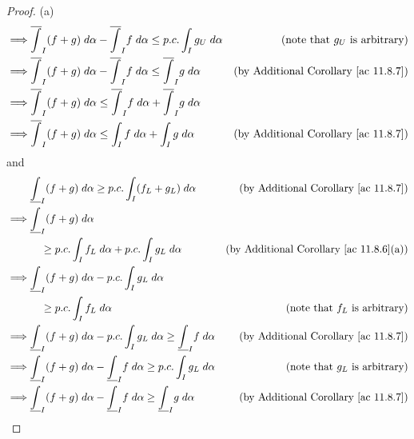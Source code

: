 \begin{proof}{(a)}
\begin{align*}
        \implies & \overline{\int}_I (f + g) \; d \alpha - \overline{\int}_I f \; d \alpha \leq p.c. \int_I g_U \; d \alpha     & \text{(note that \(g_U\) is arbitrary)}             \\
        \implies & \overline{\int}_I (f + g) \; d \alpha - \overline{\int}_I f \; d \alpha \leq \overline{\int}_I g \; d \alpha & \text{(by Additional Corollary \ref{ac 11.8.7})}    \\
        \implies & \overline{\int}_I (f + g) \; d \alpha \leq \overline{\int}_I f \; d \alpha + \overline{\int}_I g \; d \alpha &                                                     \\
        \implies & \overline{\int}_I (f + g) \; d \alpha \leq \int_I f \; d \alpha + \int_I g \; d \alpha                       & \text{(by Additional Corollary \ref{ac 11.8.7})}
    \end{align*}
    and
    \begin{align*}
                 & \underline{\int}_I (f + g) \; d \alpha \geq p.c. \int_I (f_L + g_L) \; d \alpha                                 & \text{(by Additional Corollary \ref{ac 11.8.7})}    \\
        \implies & \underline{\int}_I (f + g) \; d \alpha                                                                                                                                \\
                 & \quad \geq p.c. \int_I f_L \; d \alpha + p.c. \int_I g_L \; d \alpha                                            & \text{(by Additional Corollary \ref{ac 11.8.6}(a))} \\
        \implies & \underline{\int}_I (f + g) \; d \alpha - p.c. \int_I g_L \; d \alpha                                                                                                  \\
                 & \quad \geq p.c. \int_I f_L \; d \alpha                                                                          & \text{(note that \(f_L\) is arbitrary)}             \\
        \implies & \underline{\int}_I (f + g) \; d \alpha - p.c. \int_I g_L \; d \alpha \geq \underline{\int}_I f \; d \alpha      & \text{(by Additional Corollary \ref{ac 11.8.7})}    \\
        \implies & \underline{\int}_I (f + g) \; d \alpha - \underline{\int}_I f \; d \alpha \geq p.c. \int_I g_L \; d \alpha      & \text{(note that \(g_L\) is arbitrary)}             \\
        \implies & \underline{\int}_I (f + g) \; d \alpha - \underline{\int}_I f \; d \alpha \geq \underline{\int}_I g \; d \alpha & \text{(by Additional Corollary \ref{ac 11.8.7})}    \\

\end{align*}
\end{proof}
